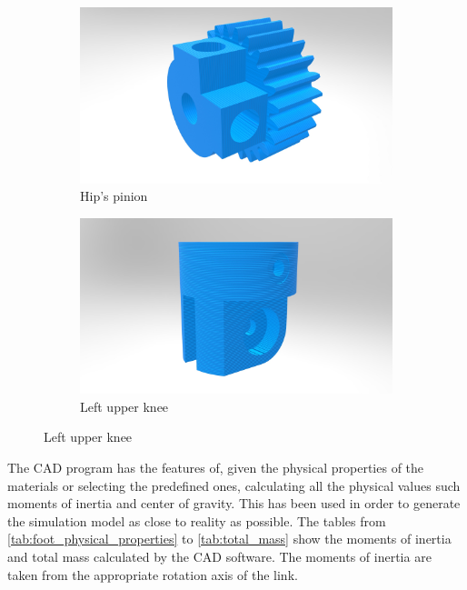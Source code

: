 \begin{figure}[ht!]
    \ContinuedFloat %
    \begin{subfigure}[b]{0.49\textwidth}
        \includegraphics[width=\textwidth]{figures/legs_hip_pinion.jpg}
        \caption{Hip's pinion}
        \label{fig:hip_pinion}
    \end{subfigure}
    \begin{subfigure}[b]{0.49\textwidth}
        \includegraphics[width=\textwidth]{figures/legs_knee_upper.jpg}
        \caption{Left upper knee}
        \label{fig:knee_upper}
    \end{subfigure}
\end{figure}

The CAD program has the features of, given the physical properties of the materials or selecting the predefined ones, calculating all the physical values such moments of inertia and center of gravity.
This has been used in order to generate the simulation model as close to reality as possible.
The tables from \ref{tab:foot_physical_properties} to \ref{tab:total_mass} show the moments of inertia and total mass calculated by the CAD software.
The moments of inertia are taken from the appropriate rotation axis of the link.

